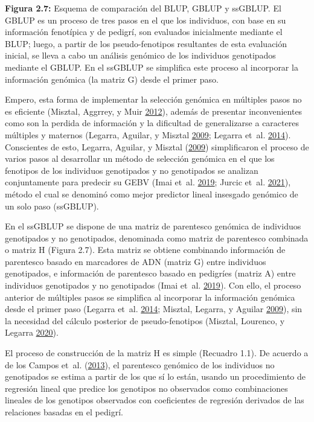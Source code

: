 \documentclass[11pt,spanish,a4paper,oneside,]{book} %
\begin{document}
\textbf{Figura 2.7:} Esquema de comparación del BLUP, GBLUP y ssGBLUP. El GBLUP es un proceso de tres pasos en el que los individuos, con base en su información fenotípica y de pedigrí, son evaluados inicialmente mediante el BLUP; luego, a partir de los pseudo-fenotipos resultantes de esta evaluación inicial, se lleva a cabo un análisis genómico de los individuos genotipados mediante el GBLUP. En el ssGBLUP se simplifica este proceso al incorporar la información genómica (la matriz G) desde el primer paso.

Empero, esta forma de implementar la selección genómica en múltiples pasos no es eficiente (Misztal, Aggrrey, y Muir \protect\hyperlink{ref-cite:14}{2012}), además de presentar inconvenientes como son la perdida de información y la dificultad de generalizarse a caracteres múltiples y maternos (Legarra, Aguilar, y Misztal \protect\hyperlink{ref-cite:17}{2009}; Legarra et~al. \protect\hyperlink{ref-cite:15}{2014}). Conscientes de esto, Legarra, Aguilar, y Misztal (\protect\hyperlink{ref-cite:17}{2009}) simplificaron el proceso de varios pasos al desarrollar un método de selección genómica en el que los fenotipos de los individuos genotipados y no genotipados se analizan conjuntamente para predecir su GEBV (Imai et~al. \protect\hyperlink{ref-cite:20}{2019}; Jurcic et~al. \protect\hyperlink{ref-cite:11}{2021}), método el cual se denominó como mejor predictor lineal insesgado genómico de un solo paso (ssGBLUP).

En el ssGBLUP se dispone de una matriz de parentesco genómica de individuos genotipados y no genotipados, denominada como matriz de parentesco combinada o matriz H (Figura 2.7). Esta matriz se obtiene combinando información de parentesco basado en marcadores de ADN (matriz G) entre individuos genotipados, e información de parentesco basado en pedigríes (matriz A) entre individuos genotipados y no genotipados (Imai et~al. \protect\hyperlink{ref-cite:20}{2019}). Con ello, el proceso anterior de múltiples pasos se simplifica al incorporar la información genómica desde el primer paso (Legarra et~al. \protect\hyperlink{ref-cite:15}{2014}; Misztal, Legarra, y Aguilar \protect\hyperlink{ref-cite:16}{2009}), sin la necesidad del cálculo posterior de pseudo-fenotipos (Misztal, Lourenco, y Legarra \protect\hyperlink{ref-cite:18}{2020}).

El proceso de construcción de la matriz H es simple (Recuadro 1.1). De acuerdo a de los Campos et~al. (\protect\hyperlink{ref-cite:31}{2013}), el parentesco genómico de los individuos no genotipados se estima a partir de los que sí lo están, usando un procedimiento de regresión lineal que predice los genotipos no observados como combinaciones lineales de los genotipos observados con coeficientes de regresión derivados de las relaciones basadas en el pedigrí.
\end{document}

